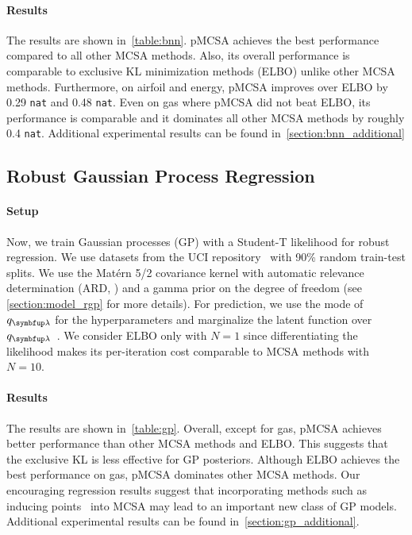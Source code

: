 \vspace{-0.1in}
\paragraph{Results}
The results are shown in~\cref{table:bnn}.
pMCSA achieves the best performance compared to all other MCSA methods.
Also, its overall performance is comparable to exclusive KL minimization methods (ELBO) unlike other MCSA methods.
Furthermore, on \textsf{airfoil} and \textsf{energy}, pMCSA improves over ELBO by 0.29 \texttt{nat} and 0.48 \texttt{nat}.
Even on \textsf{gas} where pMCSA did not beat ELBO, its performance is comparable and it dominates all other MCSA methods by roughly 0.4 \texttt{nat}.
Additional experimental results can be found in~\cref{section:bnn_additional}

  \vspace{-0.1in}
\subsection{Robust Gaussian Process Regression}\label{section:bgp}
  \vspace{-0.07in}
\paragraph{Setup}
Now, we train Gaussian processes (GP) with a Student-T likelihood for robust regression.
We use datasets from the UCI repository~\cite{Dua:2019} with 90\% random train-test splits.
We use the Mat\'ern 5/2 covariance kernel with automatic relevance determination (ARD, \citealt{neal_bayesian_1996}) and a gamma prior on the degree of freedom (see \cref{section:model_rgp} for more details).
For prediction, we use the mode of \(q_{\vlambda}\) for the hyperparameters and marginalize the latent function over \(q_{\vlambda}\)~\citep{rasmussen_gaussian_2006}.
We consider ELBO only with \(N=1\) since differentiating the likelihood makes its per-iteration cost comparable to MCSA methods with \(N=10\).

\vspace{-0.1in}
\paragraph{Results}
The results are shown in~\cref{table:gp}.
Overall, except for \textsf{gas}, pMCSA achieves better performance than other MCSA methods and ELBO.
This suggests that the exclusive KL is less effective for GP posteriors.
Although ELBO achieves the best performance on \textsf{gas}, pMCSA dominates other MCSA methods.
Our encouraging regression results suggest that incorporating methods such as inducing points~\citep{NIPS2005_4491777b} into MCSA may lead to an important new class of GP models.
Additional experimental results can be found in~\cref{section:gp_additional}.

